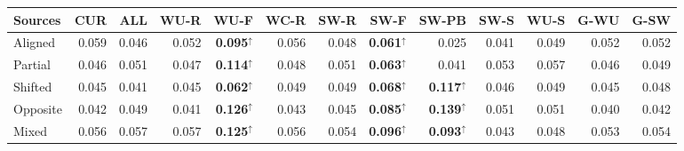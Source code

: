 \begin{tabular}{@{}lrrrrrrrrrrrr@{}}
\toprule
Sources & CUR & ALL & WU-R & WU-F & WC-R & SW-R & SW-F & SW-PB & SW-S & WU-S & G-WU & G-SW\\
\midrule
Aligned & 0.059 & 0.046 & 0.052 & \textbf{0.095}$^{\uparrow}$ & 0.056 & 0.048 & \textbf{0.061}$^{\uparrow}$ & 0.025 & 0.041 & 0.049 & 0.052 & 0.052\\
Partial & 0.046 & 0.051 & 0.047 & \textbf{0.114}$^{\uparrow}$ & 0.048 & 0.051 & \textbf{0.063}$^{\uparrow}$ & 0.041 & 0.053 & 0.057 & 0.046 & 0.049\\
Shifted & 0.045 & 0.041 & 0.045 & \textbf{0.062}$^{\uparrow}$ & 0.049 & 0.049 & \textbf{0.068}$^{\uparrow}$ & \textbf{0.117}$^{\uparrow}$ & 0.046 & 0.049 & 0.045 & 0.048\\
Opposite & 0.042 & 0.049 & 0.041 & \textbf{0.126}$^{\uparrow}$ & 0.043 & 0.045 & \textbf{0.085}$^{\uparrow}$ & \textbf{0.139}$^{\uparrow}$ & 0.051 & 0.051 & 0.040 & 0.042\\
Mixed & 0.056 & 0.057 & 0.057 & \textbf{0.125}$^{\uparrow}$ & 0.056 & 0.054 & \textbf{0.096}$^{\uparrow}$ & \textbf{0.093}$^{\uparrow}$ & 0.043 & 0.048 & 0.053 & 0.054\\
\bottomrule
\end{tabular}